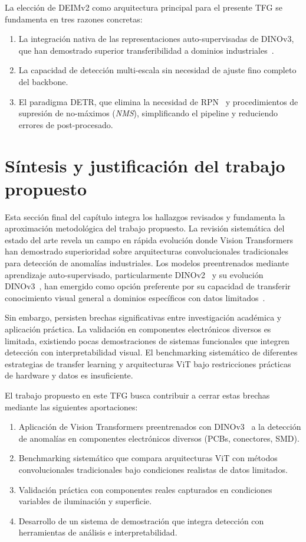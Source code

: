 La elección de DEIMv2 como arquitectura principal para el presente TFG se fundamenta en tres razones concretas:
\begin{enumerate}
    \item La integración nativa de las representaciones auto-supervisadas de DINOv3, que han demostrado superior transferibilidad a dominios industriales~\cite{huang2025semiconductor}.
    \item La capacidad de detección multi-escala sin necesidad de ajuste fino completo del backbone.
    \item El paradigma DETR, que elimina la necesidad de \acrshort{RPN}~\cite{ren_faster_2016} y procedimientos de supresión de no-máximos (\textit{NMS}), simplificando el pipeline y reduciendo errores de post-procesado.
\end{enumerate}

\section{Síntesis y justificación del trabajo propuesto}

Esta sección final del capítulo integra los hallazgos revisados y fundamenta la aproximación metodológica del trabajo propuesto. La revisión sistemática del estado del arte revela un campo en rápida evolución donde Vision Transformers han demostrado superioridad sobre arquitecturas convolucionales tradicionales para detección de anomalías industriales. Los modelos preentrenados mediante aprendizaje auto-supervisado, particularmente DINOv2~\cite{oquab2024dinov2} y su evolución DINOv3~\cite{simeoni2025dinov3}, han emergido como opción preferente por su capacidad de transferir conocimiento visual general a dominios específicos con datos limitados~\cite{huang2025semiconductor,legia2025consistent,khan2024survey}.

Sin embargo, persisten brechas significativas entre investigación académica y aplicación práctica. La validación en componentes electrónicos diversos es limitada, existiendo pocas demostraciones de sistemas funcionales que integren detección con interpretabilidad visual. El benchmarking sistemático de diferentes estrategias de transfer learning y arquitecturas ViT bajo restricciones prácticas de hardware y datos es insuficiente.

El trabajo propuesto en este \gls{TFG} busca contribuir a cerrar estas brechas mediante las siguientes aportaciones:
\begin{enumerate}
    \item Aplicación de Vision Transformers preentrenados con DINOv3~\cite{simeoni2025dinov3} a la detección de anomalías en componentes electrónicos diversos (PCBs, conectores, SMD).
    \item Benchmarking sistemático que compara arquitecturas ViT con métodos convolucionales tradicionales bajo condiciones realistas de datos limitados.
    \item Validación práctica con componentes reales capturados en condiciones variables de iluminación y superficie.
    \item Desarrollo de un sistema de demostración que integra detección con herramientas de análisis e interpretabilidad.
\end{enumerate}

